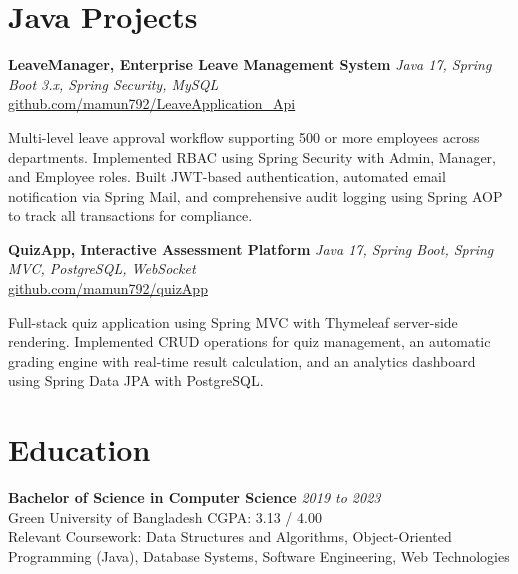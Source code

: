 \documentclass[a4paper,10.5pt]{article}
\begin{document}
\vspace{2pt}

\section{Java Projects}
\vspace{2pt}

\textbf{LeaveManager, Enterprise Leave Management System} \hfill \textit{Java 17, Spring Boot 3.x, Spring Security, MySQL}\\
\href{https://github.com/mamun792/LeaveApplication_Api}{github.com/mamun792/LeaveApplication\_Api}

\vspace{2pt}
Multi-level leave approval workflow supporting 500 or more employees across departments. Implemented RBAC using Spring Security with Admin, Manager, and Employee roles. Built JWT-based authentication, automated email notification via Spring Mail, and comprehensive audit logging using Spring AOP to track all transactions for compliance.

\vspace{4pt}

\textbf{QuizApp, Interactive Assessment Platform} \hfill \textit{Java 17, Spring Boot, Spring MVC, PostgreSQL, WebSocket}\\
\href{https://github.com/mamun792/quizApp}{github.com/mamun792/quizApp}

\vspace{2pt}
Full-stack quiz application using Spring MVC with Thymeleaf server-side rendering. Implemented CRUD operations for quiz management, an automatic grading engine with real-time result calculation, and an analytics dashboard using Spring Data JPA with PostgreSQL.

\vspace{2pt}

\section{Education}
\vspace{2pt}

\textbf{Bachelor of Science in Computer Science} \hfill \textit{2019 to 2023}\\
Green University of Bangladesh \hfill CGPA: 3.13 / 4.00\\
{\small Relevant Coursework: Data Structures and Algorithms, Object-Oriented Programming (Java), Database Systems, Software Engineering, Web Technologies}
\end{document}
